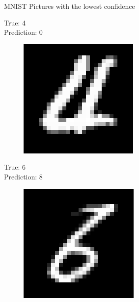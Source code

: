 \documentclass{beamer}
\begin{document}
\begin{frame}{MNIST}
	Pictures with the lowest confidence
	\vspace{0.3cm}
	
	\begin{minipage}[t]{0.32\columnwidth}
		True: 4\\
		Prediction: 0
		\begin{figure}
			\includegraphics[width=1\columnwidth]{pres_pics/low_conf/40}
		\end{figure}
	\end{minipage}
	\begin{minipage}[t]{0.32\columnwidth}
		True: 6\\
		Prediction: 8
		\begin{figure}
			\includegraphics[width=1\columnwidth]{pres_pics/low_conf/68}

\end{figure}
\end{minipage}
\end{frame}
\end{document}
